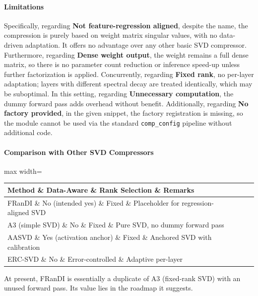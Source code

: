 \paragraph{Limitations}

Specifically, regarding \textbf{Not feature-regression aligned}, despite the name, the compression is purely based on weight matrix singular values, with no data-driven adaptation. It offers no advantage over any other basic SVD compressor. Furthermore, regarding \textbf{Dense weight output}, the weight remains a full dense matrix, so there is no parameter count reduction or inference speed-up unless further factorization is applied. Concurrently, regarding \textbf{Fixed rank}, no per-layer adaptation; layers with different spectral decay are treated identically, which may be suboptimal. In this setting, regarding \textbf{Unnecessary computation}, the dummy forward pass adds overhead without benefit. Additionally, regarding \textbf{No factory provided}, in the given snippet, the factory registration is missing, so the module cannot be used via the standard \texttt{comp\_config} pipeline without additional code.


\paragraph{Comparison with Other SVD Compressors}

\begin{center}
\begin{adjustbox}{max width=\columnwidth}
\renewcommand{\arraystretch}{1.2}
\begin{tabular}{llll}
\toprule
Method \& Data-Aware \& Rank Selection \& Remarks \\
\midrule
FRanDI \& No (intended yes) \& Fixed \& Placeholder for regression-aligned SVD \\
A3 (simple SVD) \& No \& Fixed \& Pure SVD, no dummy forward pass \\
AASVD \& Yes (activation anchor) \& Fixed \& Anchored SVD with calibration \\
ERC-SVD \& No \& Error-controlled \& Adaptive per-layer \\

\bottomrule
\end{tabular}
\end{adjustbox}
\end{center}
At present, FRanDI is essentially a duplicate of A3 (fixed-rank SVD) with an unused forward pass. Its value lies in the roadmap it suggests.


